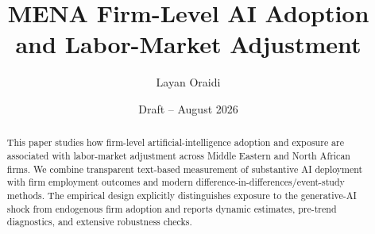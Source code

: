 \documentclass[11pt]{article}
\title{MENA Firm-Level AI Adoption and Labor-Market Adjustment}
\author{Layan Oraidi}
\date{Draft -- August 2026}
\begin{document}
\maketitle
\begin{abstract}
This paper studies how firm-level artificial-intelligence adoption and exposure are associated with labor-market adjustment across Middle Eastern and North African firms. We combine transparent text-based measurement of substantive AI deployment with firm employment outcomes and modern difference-in-differences/event-study methods. The empirical design explicitly distinguishes exposure to the generative-AI shock from endogenous firm adoption and reports dynamic estimates, pre-trend diagnostics, and extensive robustness checks.
\end{abstract}









\end{document}
